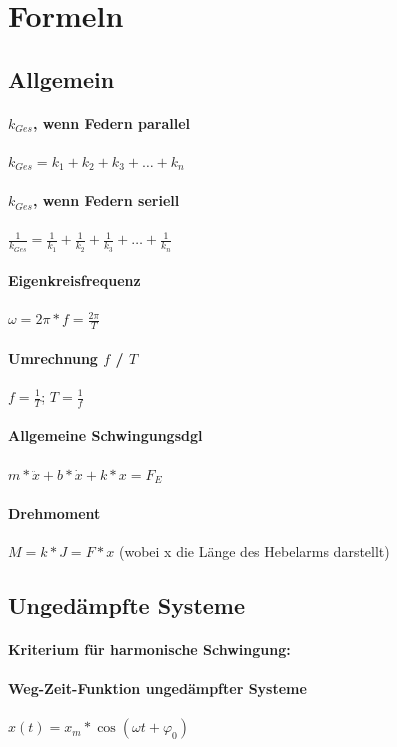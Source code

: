 \documentclass[12pt, a4paper]{scrreprt}
\begin{document}
\section{Formeln}


\subsection{Allgemein}

\paragraph{\(k_{Ges}\), wenn Federn parallel} \dotfill \(k_{Ges}=k_1+k_2+k_3+ \dots +k_n\)
\paragraph{\(k_{Ges}\), wenn Federn seriell} \dotfill \(\frac{1}{k_{Ges}}=\frac{1}{k_1}+\frac{1}{k_2}+\frac{1}{k_3}+ \dots +\frac{1}{k_n}\)
\paragraph{Eigenkreisfrequenz} \dotfill \(\omega=2\pi*f=\frac{2\pi}{T}\)
\paragraph{Umrechnung \(f\) / \(T\)}\dotfill \(f=\frac{1}{T}\); \(T=\frac{1}{f}\)
\paragraph{Allgemeine Schwingungsdgl} \dotfill \(m* \ddot x + b*\dot x + k *x=F_E\)
\paragraph{Drehmoment} \dotfill \(M = k * J = F * x\) (wobei x die Länge des Hebelarms darstellt)


\subsection{Ungedämpfte Systeme}

\paragraph{Kriterium für harmonische Schwingung: } 
\paragraph{Weg-Zeit-Funktion ungedämpfter Systeme} \dotfill \(x(t)=x_m* \cos(\omega t + \varphi_0)\)
\end{document}
